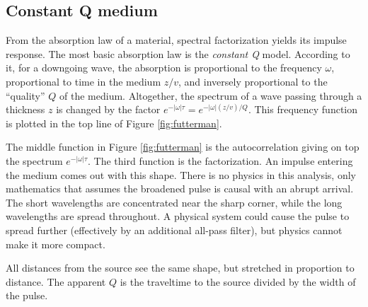 \subsection{Constant Q medium}
From the absorption law of a material, spectral factorization yields its impulse response.
The most basic absorption law is the {\em constant Q} model.
According to it, for a downgoing wave,
the absorption is proportional to the frequency $\omega$,
proportional to time in the medium $z/v$,
and inversely proportional to the ``quality'' $Q$ of the medium.
Altogether, the spectrum of a wave passing through a thickness $z$ is changed by the factor
$ e^{-|\omega|\tau} = e^{-|\omega|(z/v)/Q} $.
This frequency function is plotted in the top line of Figure \ref{fig:futterman}.

\par

The middle function in Figure \ref{fig:futterman}
is the autocorrelation giving on top
the spectrum
$e^{-|\omega|\tau}$.
The third function is the factorization.
An impulse entering the medium comes out with this shape.
There is no physics in this analysis,
only mathematics that assumes the broadened pulse
is causal with an abrupt arrival.
The short wavelengths are concentrated near the sharp corner,
while the long wavelengths are spread throughout.
A physical system could cause the pulse to spread further
(effectively by an additional all-pass filter),
but physics cannot make it more compact.
\par
All distances from the source see the same shape, but stretched
in proportion to distance.
The apparent $Q$ is
the traveltime to the source divided by the width of the pulse.


